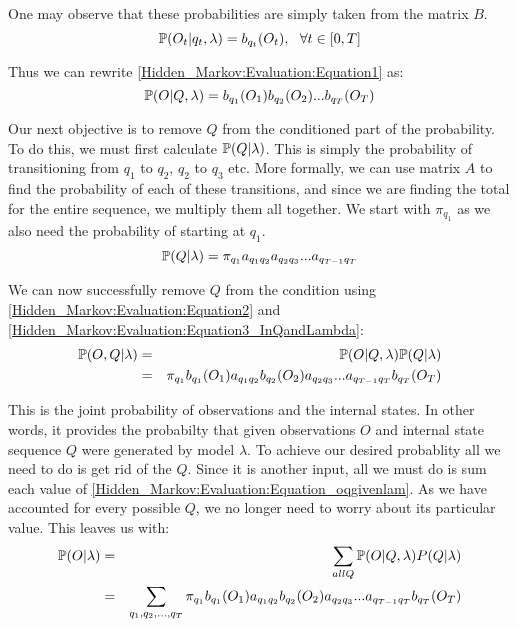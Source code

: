 One may observe that these probabilities are simply taken from the matrix $B$. 
\begin{equation}
    \mathbb{P} (O_t | q_t, \lambda) = b_{q_t}(O_t), \ \ \forall t \in [0,T] 
\end{equation}

Thus we can rewrite \ref{Hidden_Markov:Evaluation:Equation1} as:
\begin{equation}
    \label{Hidden_Markov:Evaluation:Equation2}
    \mathbb{P} (O | Q, \lambda) = b_{q_1}(O_1) b_{q_2}(O_2)  ...  b_{q_T}(O_T)
\end{equation}

Our next objective is to remove $Q$ from the conditioned part of the probability. To do this, we must first calculate $\mathbb{P} (Q | \lambda)$. This is simply the probability of transitioning from $q_1$ to $q_2$, $q_2$ to $q_3$ etc. More formally, we can use matrix $A$ to find the probability of each of these transitions, and since we are finding the total for the entire sequence, we multiply them all together. We start with $\pi_{q_1}$ as we also need the probability of starting at $q_1$.
\begin{equation}
    \label{Hidden_Markov:Evaluation:Equation3_InQandLambda}
    \mathbb{P} ( Q | \lambda) = \pi_{q_1} a_{q_1q_2} a_{q_2q_3} ... a_{q_{T-1}q_T}
\end{equation}

We can now successfully remove $Q$ from the condition using \ref{Hidden_Markov:Evaluation:Equation2} and \ref{Hidden_Markov:Evaluation:Equation3_InQandLambda}:
\begin{eqnarray}
    \label{Hidden_Markov:Evaluation:Equation_oqgivenlam}
    \mathbb{P} (O,Q | \lambda) & = & \mathbb{P}(O | Q, \lambda) \mathbb{P}(Q | \lambda) \\
                          & = & \pi_{q_1} b_{q_1}(O_1) a_{q_1q_2} b_{q_2}(O_2) a_{q_2q_3} ... a_{q_{T-1}q_T} b_{q_T}(O_T)
\end{eqnarray}

This is the joint probability of observations and the internal states. In other words, it provides the probabilty that given observations $O$ and internal state sequence $Q$ were generated by model $\lambda$. To achieve our desired probablity all we need to do is get rid of the $Q$. Since it is another input, all we must do is sum each value of \ref{Hidden_Markov:Evaluation:Equation_oqgivenlam}. As we have accounted for every possible $Q$, we no longer need to worry about its particular value. This leaves us with:
\begin{eqnarray}
    \label{Hidden_Markov:Evaluation:Equation_ogivenlamsumq}
    \mathbb{P} (O | \lambda) & = & \sum_{all Q} \mathbb{P}(O| Q,\lambda)P(Q|\lambda) \\
                        & = & \sum_{q_1,q_2,...,q_T} \pi_{q_1} b_{q_1}(O_1) a_{q_1q_2} b_{q_2}(O_2) a_{q_2q_3} ... a_{q_{T-1}q_T} b_{q_T}(O_T)
\end{eqnarray} 

